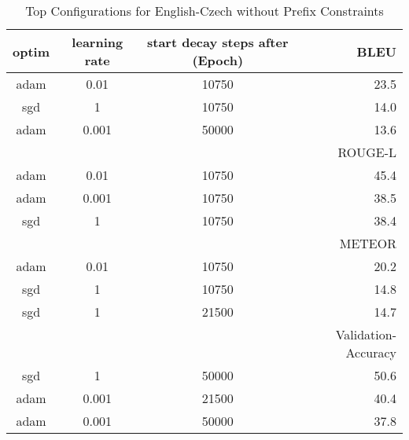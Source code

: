 \begin{table}
	\caption{Top Configurations for English-Czech without Prefix Constraints}
	\label{tab:optim_clean-cs-en}
	\centering
\begin{tabular}{|c|c|c|r|}
	\hline
	optim   & learning rate & start decay steps after (Epoch)  & BLEU\\
	\hline
	adam &      0.01   &       10750      & 23.5 \\
	sgd  &       1     &       10750      & 14.0 \\
	adam &     0.001   &       50000      & 13.6 \\
	\hline
	\hline
	& & & ROUGE-L \\
	\hline
	adam &      0.01   &  10750 & 45.4 \\
	adam &     0.001   &  10750 & 38.5 \\
	sgd  &       1     &  10750 & 38.4 \\
	\hline
	\hline
	& & & METEOR \\
	\hline
	adam &0.01 & 10750 & 20.2 \\
	sgd  & 1   & 10750 & 14.8 \\
	sgd  & 1   & 21500 & 14.7 \\
	\hline
	\hline
	& & & Validation-Accuracy \\
	\hline
	sgd  &       1   & 50000 & 50.6\\
	adam &     0.001 & 21500 & 40.4\\
	adam &     0.001 & 50000 & 37.8\\
	\hline
\end{tabular}
\end{table}
